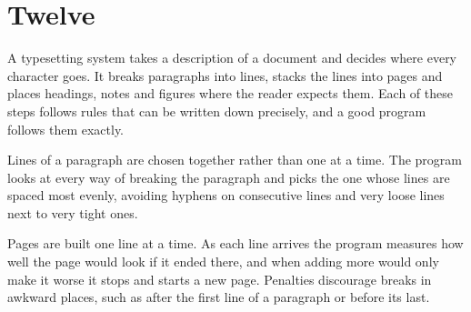 \documentclass[12pt]{article}
\begin{document}
\section{Twelve}
A typesetting system takes a description of a document and decides where every character goes. It breaks paragraphs into lines, stacks the lines into pages and places headings, notes and figures where the reader expects them. Each of these steps follows rules that can be written down precisely, and a good program follows them exactly.

Lines of a paragraph are chosen together rather than one at a time. The program looks at every way of breaking the paragraph and picks the one whose lines are spaced most evenly, avoiding hyphens on consecutive lines and very loose lines next to very tight ones.

Pages are built one line at a time. As each line arrives the program measures how well the page would look if it ended there, and when adding more would only make it worse it stops and starts a new page. Penalties discourage breaks in awkward places, such as after the first line of a paragraph or before its last.
\end{document}
